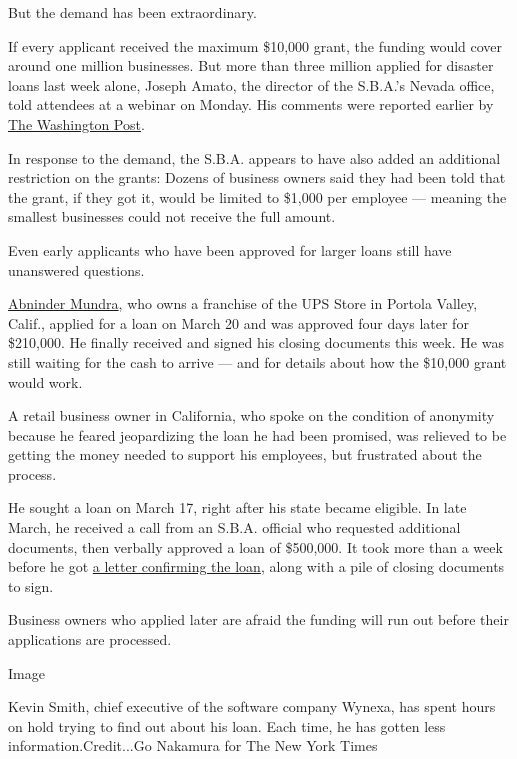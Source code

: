 But the demand has been extraordinary.

If every applicant received the maximum \$10,000 grant, the funding
would cover around one million businesses. But more than three million
applied for disaster loans last week alone, Joseph Amato, the director
of the S.B.A.'s Nevada office, told attendees at a webinar on Monday.
His comments were reported earlier by
\href{https://www.washingtonpost.com/business/2020/04/08/video-sba-official-blasts-big-banks-over-failure-quickly-distribute-loans/}{The
Washington Post}.

In response to the demand, the S.B.A. appears to have also added an
additional restriction on the grants: Dozens of business owners said
they had been told that the grant, if they got it, would be limited to
\$1,000 per employee --- meaning the smallest businesses could not
receive the full amount.

Even early applicants who have been approved for larger loans still have
unanswered questions.

\href{https://www.nytimes3xbfgragh.onion/2020/04/02/business/small-business-coronavirus-stimulus.html}{Abninder
Mundra}, who owns a franchise of the UPS Store in Portola Valley,
Calif., applied for a loan on March 20 and was approved four days later
for \$210,000. He finally received and signed his closing documents this
week. He was still waiting for the cash to arrive --- and for details
about how the \$10,000 grant would work.

A retail business owner in California, who spoke on the condition of
anonymity because he feared jeopardizing the loan he had been promised,
was relieved to be getting the money needed to support his employees,
but frustrated about the process.

He sought a loan on March 17, right after his state became eligible. In
late March, he received a call from an S.B.A. official who requested
additional documents, then verbally approved a loan of \$500,000. It
took more than a week before he got
\href{https://int.graylady3jvrrxbe.onion/data/documenthelper/6870-sba-eidl-loan-approval-letter/optimized/full.pdf}{a
letter confirming the loan}, along with a pile of closing documents to
sign.

Business owners who applied later are afraid the funding will run out
before their applications are processed.

Image

Kevin Smith, chief executive of the software company Wynexa, has spent
hours on hold trying to find out about his loan. Each time, he has
gotten less information.Credit...Go Nakamura for The New York Times

